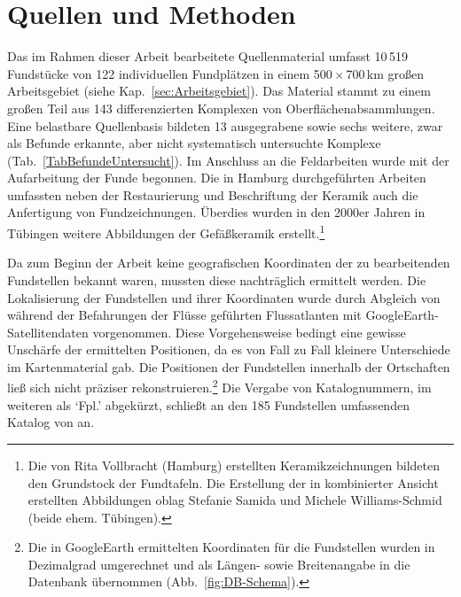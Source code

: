 \chapter{Quellen und Methoden}\label{sec:Quellen}

Das im Rahmen dieser Arbeit bearbeitete Quellenmaterial umfasst 10\,519 Fundstücke von 122 individuellen Fundplätzen in einem 500\,$\times$\,700\,km großen Arbeitsgebiet (siehe Kap.~\ref{sec:Arbeitsgebiet}). Das Material stammt zu einem großen Teil aus 143 differenzierten Komplexen von Oberflächenabsammlungen. Eine belastbare Quellenbasis bildeten 13 ausgegrabene sowie sechs weitere, zwar als Befunde erkannte, aber nicht systematisch untersuchte Komplexe (Tab.~\ref{TabBefundeUntersucht}). Im Anschluss an die Feldarbeiten wurde mit der Aufarbeitung der Funde begonnen. Die in Hamburg durchgeführten Arbeiten umfassten neben der Restaurierung und Beschriftung der Keramik auch die Anfertigung von Fundzeichnungen. Überdies wurden in den 2000er Jahren in Tübingen weitere Abbildungen der Gefäßkeramik erstellt.\footnote{Die von Rita Vollbracht (Hamburg) erstellten Keramikzeichnungen bildeten den Grundstock der Fundtafeln. Die Erstellung der in kombinierter Ansicht erstellten Abbildungen oblag Stefanie Samida und Michele Williams-Schmid (beide ehem. Tübingen).}

Da zum Beginn der Arbeit keine geografischen Koordinaten der zu bearbeitenden Fundstellen bekannt waren, mussten diese nachträglich ermittelt werden. Die Lokalisierung der Fundstellen und ihrer Koordinaten wurde durch Abgleich von während der Befahrungen der Flüsse geführten Flussatlanten mit GoogleEarth-Satellitendaten vorgenommen. Diese Vorgehensweise bedingt eine gewisse Unschärfe der ermittelten Positionen, da es von Fall zu Fall kleinere Unterschiede im Kartenmaterial gab. Die Positionen der Fundstellen innerhalb der Ortschaften ließ sich nicht präziser rekonstruieren.\footnote{Die in GoogleEarth ermittelten Koordinaten für die Fundstellen wurden in Dezimalgrad umgerechnet und als Längen- sowie Breitenangabe in die Datenbank übernommen (Abb.~\ref{fig:DB-Schema}).} Die Vergabe von Katalognummern, im weiteren als \enquote*{Fpl.} abgekürzt, schließt an den 185 Fundstellen umfassenden Katalog von \textcite[542f. Karte 1]{Wotzka.1995} an.

